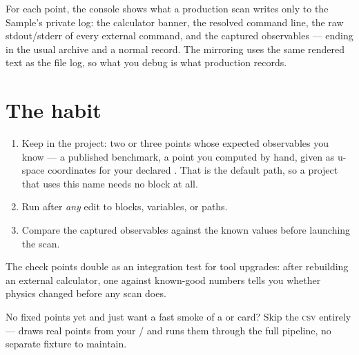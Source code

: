 For each point, the console shows what a production scan writes only to the Sample's
private log: the calculator banner, the resolved command line, the raw
stdout/stderr of every external command, and the captured observables --- ending in the
usual archive and a normal  record. The mirroring uses the same
rendered text as the file log, so what you debug is what production records.

\section{The habit}
\label{sec:check-habit}

\begin{enumerate}
  \item Keep  in the project: two or three points
        whose expected observables you know --- a published benchmark, a point you
        computed by hand, given as u-space coordinates for your declared
        . That is the default path, so a project that uses this name
        needs no  block at all.
  \item Run  after \emph{any} edit to  blocks,
         variables, or  paths.
  \item Compare the captured observables against the known values before launching the
        scan.
\end{enumerate}

\begin{jtip}
The check points double as an integration test for tool upgrades: after rebuilding an
external calculator, one  against known-good numbers tells you
whether physics changed before any scan does.
\end{jtip}

\begin{jtip}
No fixed points yet and just want a fast smoke of a  or
 card? Skip the \textsc{csv} entirely ---  draws
 real points from your / and runs
them through the full pipeline, no separate fixture to maintain.
\end{jtip}
